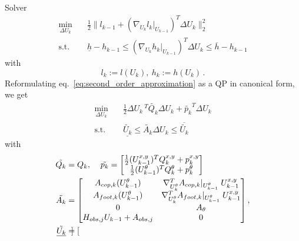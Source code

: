 \begin{frame}{Solver}
\begin{subequations}
    \label{eq:second_order_approximation}
    \begin{align}
        \min_{\Delta U_k} \quad & \frac{1}{2} \lVert l_{k-1} + (\nabla_{U_{k}} l_k|_{U_{k-1}})^T \Delta U_k \rVert_2^2 \label{eq:second_order_approximation_objective}\\
        \text{s.t.} \quad & \underline{h} - h_{k-1} \leq (\nabla_{U_{k}} h_k|_{U_{k-1}})^T \Delta U_k \leq \overline{h} - h_{k-1}
        \label{eq:second_order_approximation_inequality_constraints}
    \end{align}
\end{subequations}
with
\begin{equation*}
    l_k := l(U_k),\ h_k := h(U_k) \,.
\end{equation*}
Reformulating eq.~\eqref{eq:second_order_approximation} as a QP in canonical form, we get
\begin{subequations}
    \label{eq:final_qp}
    \begin{align}
        \min_{\Delta U_k} \quad & \frac{1}{2} \Delta U_{k}\,^T \tilde{Q_k} \Delta U_{k} + \tilde{p_k}^T \Delta U_{k} \\
        \text{s.t.}       \quad & \underline{\tilde{U_k}} \leq \tilde{A_k} \Delta U_k \leq \overline{\tilde{U_k}}
    \end{align}
\end{subequations}
with
\begin{align}
    \label{eq:problem_objective}
    \tilde{Q_k} &= Q_k
    ,\;\;\;\;
    \tilde{p_k} =
    \begin{bmatrix}
        \frac{1}{2} (U_{k-1}^{x,y})^T Q_k^{x,y}       + p_k^{x,y} \\
        \frac{1}{2} (U_{k-1}^{\theta})^T Q_k^{\theta} + p_k^{\theta}
    \end{bmatrix} \notag \\
    \tilde{A_k} &=
    \begin{bmatrix}
A_{cop,k}(U_{k-1}^\theta) &
\nabla_{U_{k}^{\theta}}^T A_{cop,k}|_{U_{k-1}^\theta} \; U_{k-1}^{x,y}\\
A_{foot,k}(U_{k-1}^\theta)&
\nabla_{U_{k}^{\theta}}^T A_{foot,k}|_{U_{k-1}^\theta} \; U_{k-1}^{x,y}\\
0 & A_{\theta} \\
H_{obs,j} U_{k-1} + A_{obs,j} &   0
    \end{bmatrix}, \notag
    \\
    \underline{\tilde{U_k}} &=
    \begin{bmatrix}

\end{bmatrix}
\end{align}
\end{frame}
